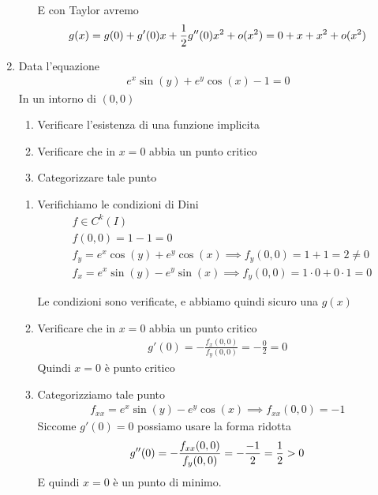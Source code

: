 \begin{enumerate}
\begin{enumerate}
		E con Taylor avremo
		\begin{align}
			g(x)= g(0) + g'(0)x + \frac{1}{2} g''(0)x^2 + o(x^2)= 0+x+x^2 + o(x^2)
		\end{align}	
	\end{enumerate}
		
	\item Data l'equazione
	\begin{align}
		e^x \sin(y) + e^y\cos(x)-1=0
	\end{align}
	In un intorno di $(0,0)$
	\begin{enumerate}
		\item Verificare l'esistenza di una funzione implicita 
		\item Verificare che in $x=0$ abbia un punto critico
		\item Categorizzare tale punto
	\end{enumerate}
	
	\bigskip
	\begin{enumerate}
		\item Verifichiamo le condizioni di Dini
		\begin{align}
			{}&f\in C^k(I)\\
			& f(0,0)=1-1=0\\
			& f_y= e^x \cos(y) + e^y\cos(x) \implies f_y(0,0)= 1+1=2\neq 0 \\
			& f_x= e^x \sin(y) - e^y\sin(x) \implies f_y(0,0)= 1\cdot 0+0\cdot 1= 0
		\end{align}
		
		Le condizioni sono verificate, e abbiamo quindi sicuro una $g(x)$
		
		\item Verificare che in $x=0$ abbia un punto critico
		\begin{align}
			g'(0)=-\frac{f_x(0,0)}{f_y(0,0)}=-\frac{0}{2}=0
		\end{align}
		Quindi $x=0$ è punto critico
		
		\item Categorizziamo tale punto
		\begin{align}
			f_{xx}= e^x \sin(y) - e^y\cos(x) \implies f_{xx}(0,0)= -1
		\end{align}
		Siccome $g'(0)=0$ possiamo usare la forma ridotta
		\begin{align}
			g''(0)= -\frac{f_{xx}(0,0)}{f_y(0,0)}= - \frac{-1}{2}= \frac{1}{2} > 0 
		\end{align}
		E quindi $x=0$ è un punto di minimo. 
	\end{enumerate}
	

\end{enumerate}
